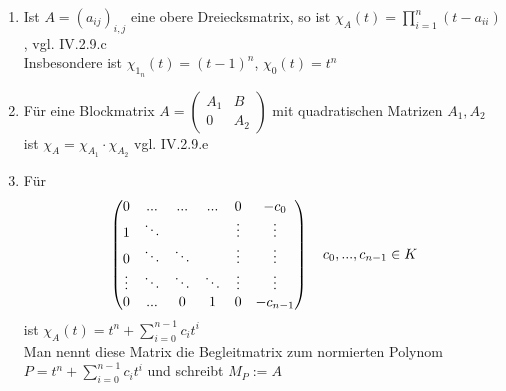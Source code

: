 \begin{example}
	\begin{enumerate}
		\item Ist $A=(a_{ij})_{i,j}$ eine obere Dreiecksmatrix, so ist $\chi_A(t)=\prod\limits_{i=1}^n (t-a_{ii})$, vgl. IV.2.9.c \\ %
		Insbesondere ist $\chi_{1_n}(t)=(t-1)^n$, $\chi_0(t)=t^n$
		\item Für eine Blockmatrix $A=\begin{pmatrix}A_1&B \\ 0&A_2\end{pmatrix}$ mit quadratischen Matrizen $A_1,A_2$ ist $\chi_A=\chi_{A_1}\cdot \chi_{A_2}$ vgl. IV.2.9.e %
		\item Für
		\begin{align}
			\begin{pmatrix}
			0&...&...&...&0&-c_0  \\ 
			1& \ddots&\;&\;&\vdots&\vdots  \\ 
			0&\ddots&\ddots&\;&\vdots&\vdots  \\ 
			\vdots&\ddots&\ddots&\ddots&\vdots&\vdots  \\ 
			0&...&0&1&0&-c_{n-1} 
			\end{pmatrix} \quad c_0,...,c_{n-1}\in K \notag
		\end{align}
		ist $\chi_A(t)=t^n+\sum\limits_{i=0}^{n-1} c_i t^i$ \\
		Man nennt diese Matrix die Begleitmatrix zum normierten Polynom $P=t^n+\sum\limits_{i=0}^{n-1} c_i t^i$ und schreibt $M_P:=A$
	\end{enumerate}
\end{example}